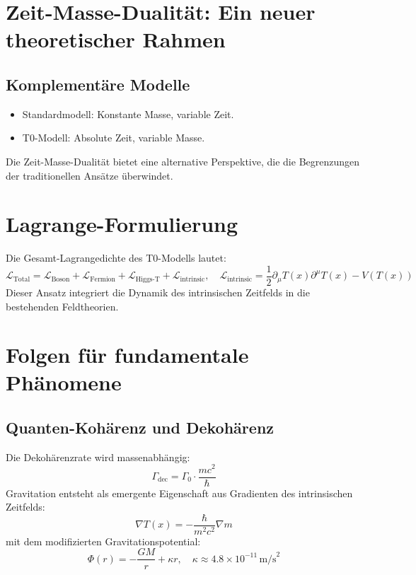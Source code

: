 \documentclass{article}
\newcommand{\Tfield}{T(x)}
\begin{document}
	\section{Zeit-Masse-Dualität: Ein neuer theoretischer Rahmen}
	\subsection{Komplementäre Modelle}
	\begin{itemize}
		\item Standardmodell: Konstante Masse, variable Zeit.
		\item T0-Modell: Absolute Zeit, variable Masse.
	\end{itemize}
	Die Zeit-Masse-Dualität bietet eine alternative Perspektive, die die Begrenzungen der traditionellen Ansätze überwindet.
	
	\section{Lagrange-Formulierung}
	Die Gesamt-Lagrangedichte des T0-Modells lautet:
	\begin{equation}
		\mathcal{L}_{\text{Total}} = \mathcal{L}_{\text{Boson}} + \mathcal{L}_{\text{Fermion}} + \mathcal{L}_{\text{Higgs-T}} + \mathcal{L}_{\text{intrinsic}}, \quad \mathcal{L}_{\text{intrinsic}} = \frac{1}{2} \partial_\mu \Tfield \partial^\mu \Tfield - V(\Tfield)
	\end{equation}
	Dieser Ansatz integriert die Dynamik des intrinsischen Zeitfelds in die bestehenden Feldtheorien.
	
	\section{Folgen für fundamentale Phänomene}
	\subsection{Quanten-Kohärenz und Dekohärenz}
	Die Dekohärenzrate wird massenabhängig:
	\begin{equation}
		\Gamma_{\text{dec}} = \Gamma_0 \cdot \frac{m c^2}{\hbar}
	\end{equation}
	Gravitation entsteht als emergente Eigenschaft aus Gradienten des intrinsischen Zeitfelds:
	\begin{equation}
		\nabla \Tfield = -\frac{\hbar}{m^2 c^2} \nabla m
	\end{equation}
	mit dem modifizierten Gravitationspotential:
	\begin{equation}
		\Phi(r) = -\frac{GM}{r} + \kappa r, \quad \kappa \approx 4.8 \times 10^{-11} \, \text{m/s}^2
	\end{equation}
	
\end{document}
